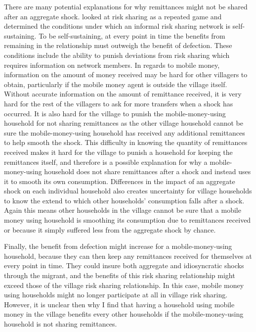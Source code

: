 There are many potential explanations for why remittances might not be shared after an aggregate shock. \cite{coate1993} looked at risk sharing as a repeated game and determined the conditions under which an informal risk sharing network is self-sustaining. To be self-sustaining, at every point in time the benefits from remaining in the relationship must outweigh the benefit of defection. These conditions include the ability to punish  deviations from risk sharing which requires information on network members. In regards to mobile money, information on the amount of money received may be hard for other villagers to obtain, particularly if the mobile money agent is outside the village itself. Without accurate information on the amount of remittance received, it is very hard for the rest of the villagers to ask for more transfers when a shock has occurred. It is also hard for the village to punish the mobile-money-using household for not sharing remittances as the other village household cannot be sure the mobile-money-using household has received any additional remittances to help smooth the shock. This difficulty in knowing the quantity of remittances received makes it hard for the village to punish a household for keeping the remittances itself, and therefore is a possible explanation for why a mobile-money-using household does not share remittances after a shock and instead uses it to smooth its own consumption. Differences in the impact of an aggregate shock on each individual household also creates uncertainty for village households to know the extend to which other households' consumption falls after a shock. Again this means other households in the village cannot be sure that a mobile money using household is smoothing its consumption due to remittances received or because it simply suffered less from the aggregate shock by chance. 

Finally, the benefit from defection might increase for a mobile-money-using household, because they can then keep any remittances received for themselves at every point in time. They could insure both aggregate and idiosyncratic shocks through the migrant, and the benefits of this risk sharing relationship might exceed those of the village risk sharing relationship. In this case, mobile money using households might no longer participate at all in village risk sharing. However, it is unclear then why I find that having a household using mobile money in the village  benefits every other households if the mobile-money-using household is not sharing remittances.  

